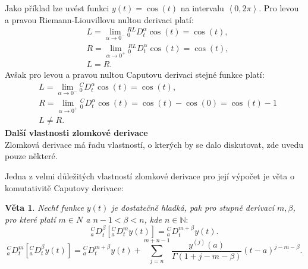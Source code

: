 \documentclass[a4paper,12pt,twoside]{article}
\newtheorem{veta}{Věta}[section]
\theoremstyle{definition}
\theoremstyle{remark}
\numberwithin{equation}{section}
\numberwithin{table}{section}
\numberwithin{figure}{section}
\newcommand{\N}{\mathbb{N}}
\begin{document}
Jako příklad lze uvést funkci $y\left(t\right) =  \cos{\left(t\right)}$ na intervalu $\left\langle 0, 2\pi \right\rangle$. Pro levou a pravou Riemann-Liouvillovu nultou derivaci platí:%
\begin{align}
	&L = \lim\limits_{\alpha \to 0^{-}} {_{0}^{RL}D^{\alpha}_{t}} \cos{\left(t\right)} = \cos{\left(t\right)}, \\
	&R = \lim\limits_{\alpha \to {0}^{+}} {_{0}^{RL}D^{\alpha}_{t}} \cos{\left(t\right)} = \cos{\left(t\right)}, \\
	&L = R.
\end{align}
Avšak pro levou a pravou nultou Caputovu derivaci stejné funkce platí:
\begin{align}
	&L = \lim\limits_{\alpha \to 0^{-}} {_{0}^{C}D^{\alpha}_{t}} \cos{\left(t\right)} = \cos{\left(t\right)}, \\
	&R = \lim\limits_{\alpha \to {0}^{+}} {_{0}^{C}D^{\alpha}_{t}} \cos{\left(t\right)} = \cos{\left(t\right)}  - \cos{\left(0\right)} = \cos{\left(t\right)} - 1 \\
	&L \neq R.
\end{align}
\textbf{Další vlastnosti zlomkové derivace}\\
Zlomková derivace má řadu vlastností, o kterých by se dalo diskutovat, zde uvedu pouze některé.

Jedna z velmi důležitých vlastností zlomkové derivace pro její výpočet je věta o komutativitě Caputovy derivace:

\begin{veta} \label{CaputovaKomutativita}
	Nechť funkce $y\left(t\right)$ je dostatečně hladká, pak pro stupně derivací $m, \beta$, pro které platí $m \in N$ a $n-1 < \beta < n$, kde $n \in \N:$	
	$$
		{_{a}^{C}D^{\beta}_{t}} \left[  {_{a}^{C}D^{m}_{t}} y\left(t\right)\right] = {_{a}^{C}D^{m + \beta}_{t}} y\left(t\right).
	$$
	$$
		{_{a}^{C}D^{m}_{t}} \left[  {_{a}^{C}D^{\beta}_{t}} y\left(t\right)\right] = {_{a}^{C}D^{m + \beta}_{t}} y\left(t\right) + \sum_{j=n}^{m+n-1} \frac{y^{\left(j\right)}\left(a\right)}{\Gamma \left(1+j-m- \beta\right)} \left(t-a\right)^{j-m-\beta}.
	$$
\end{veta}
\end{document}

